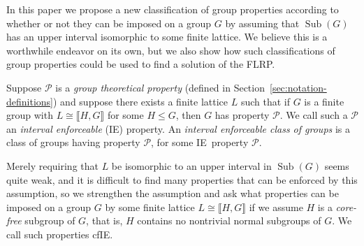 \documentclass{gen-j-l}
\newcommand{\lb}{\ensuremath{\llbracket}}
\newcommand{\rb}{\ensuremath{\rrbracket}}
\newcommand{\<}{\ensuremath{\langle}}
\renewcommand{\>}{\ensuremath{\rangle}}
\theoremstyle{plain}
\theoremstyle{definition}
\theoremstyle{remark}
\numberwithin{theorem}{section}
\numberwithin{claim}{section}
\numberwithin{equation}{section}
\numberwithin{conjecture}{section}
\newcommand{\defn}[1]{\emph{#1}}
\renewcommand{\leq}{\ensuremath{\leqslant}}
\newcommand{\Sub}{\ensuremath{\operatorname{Sub}}}
\newcommand{\2}{\ensuremath{\mathbf{2}}}
\newcommand{\3}{\ensuremath{\mathbf{3}}}
\newcommand{\cP}{\ensuremath{\mathcal{P}}}
\newcommand{\IE}{{\small IE}}
\begin{document}
In this paper we propose a new classification of group properties according to whether
or not they can be imposed on a group $G$ by assuming that $\Sub(G)$ has an
upper interval isomorphic to some  finite
lattice.  We believe this is a worthwhile endeavor on its own, but 
we also show how such classifications of group properties could be used to find a
solution of the \acs{FLRP}.

Suppose $\cP$ is a \emph{group theoretical property} 
(defined in Section~\ref{sec:notation-definitions}) 
and suppose there exists a finite lattice $L$ such that if $G$ is a finite group
with $L \cong \lb H,G \rb$ for some $H\leq G$, then $G$ has property $\cP$.  We call
such a  $\cP$ an \emph{interval enforceable} (\IE) property.  
An \defn{interval enforceable class of groups} is a class of groups having
property $\cP$, for some \IE\ property $\cP$. 

Merely requiring that $L$ be isomorphic to an upper interval in $\Sub(G)$ seems quite
weak, and it is difficult to find many properties that can be enforced by this
assumption,
so we strengthen the assumption and ask what properties can be imposed on a
group $G$ by some finite lattice $L\cong\lb H,G \rb$ if we assume $H$ is a \emph{core-free}
subgroup of $G$, that is, $H$ contains no nontrivial normal subgroups of $G$.  
We call such properties \ac{cfIE}.
\end{document}
